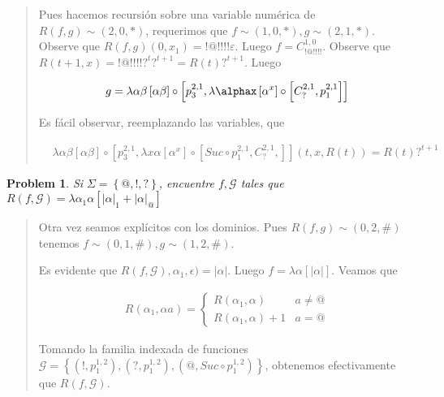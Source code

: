 \documentclass[a4paper, 12pt]{article}
\newtheorem{problem}{Problem}
\newtheorem{problem}{Problem}
\begin{document}
\small
\begin{quote}

Pues hacemos recursión sobre una variable numérica de $R(f, g) \sim (2, 0, *)$, requerimos
que $f \sim  (1, 0, *), g \sim (2, 1, *)$. Observe que $R(f, g)(0, x_1) =
!@!!!!\varepsilon $. Luego $f = C_{!@!!!!}^{1, 0}$. Observe que $R(t + 1, x) =
!@!!!!?^t ?^{t+1} = R(t) ?^{t+1}$. Luego 

\begin{align*}
    g = \lambda \alpha\beta \left[ \alpha\beta \right]  \circ \left[ p_3^{2, 1},
    \lambda \alphax \left[  \alpha^x  \right] \circ \left[ C_?^{2, 1}, p_1^{2, 1} \right] \right]
\end{align*}

Es fácil observar, reemplazando las variables, que

\begin{align*}
    &\lambda \alpha\beta \left[ \alpha\beta \right]  \circ \left[ p_3^{2, 1},
    \lambda  x\alpha \left[  \alpha^x  \right] \circ \left[Suc \circ p_1^{2, 1},  C_?^{2, 1},  \right] \right] \left( t, x, R(t) \right) =R(t) ?^{t + 1}
\end{align*}

\end{quote}
\normalsize


\begin{problem}
    Si $\Sigma = \left\{ @, !, ? \right\} $, encuentre $f, \mathcal{G}$ tales
    que $R(f, \mathcal{G}) = \lambda \alpha_1 \alpha  \left[ |\alpha|_1 +
    |\alpha|_{@}  \right]$
\end{problem}


\small
\begin{quote}

Otra vez seamos explícitos con los dominios. Pues $R(f, g) \sim (0, 2, \#)$
tenemos $f \sim (0, 1, \#), g \sim (1, 2, \#)$.

Es evidente que $R(f, \mathcal{G}), \alpha_1, \epsilon) = |\alpha|$. Luego $f =
\lambda \alpha \left[ |\alpha|  \right]$. Veamos que 

\begin{align*}
    R(\alpha_1, \alpha a) = \begin{cases}
        R(\alpha_1, \alpha) & a \neq @ \\ 
        R(\alpha_1, \alpha) + 1 & a = @
    \end{cases}
\end{align*}

Tomando la familia indexada de funciones 
$\mathcal{G} = \left\{ (!, p_1^{1, 2} ), (?, p_1^{1, 2}), 
    (@, Suc \circ p_1^{1, 2} )\right\}  $, obtenemos efectivamente que $R(f,
    \mathcal{G})$. 

\end{quote}
\normalsize
\end{document}
